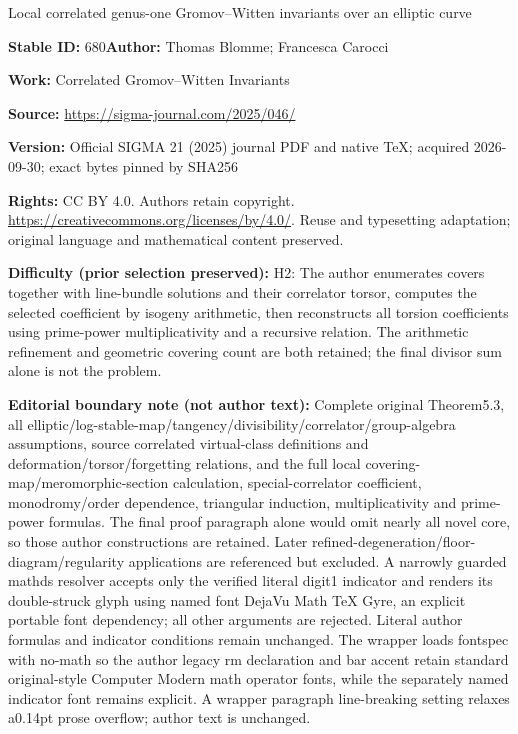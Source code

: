 \documentclass[11pt]{article}
\numberwithin{equation}{section}
\numberwithin{equation}{section}
\theoremstyle{definition}
\begin{document}
\begin{center}\Large Local correlated genus-one Gromov–Witten invariants over an elliptic curve\end{center}
\noindent\textbf{Stable ID:} 680\quad\textbf{Author:} Thomas Blomme; Francesca Carocci\par
\noindent\textbf{Work:} Correlated Gromov–Witten Invariants\par
\noindent\textbf{Source:} \url{https://sigma-journal.com/2025/046/}\par
\noindent\textbf{Version:} Official SIGMA 21 (2025) journal PDF and native TeX; acquired 2026-09-30; exact bytes pinned by SHA256\par
\noindent\textbf{Rights:} CC BY 4.0. Authors retain copyright. \url{https://creativecommons.org/licenses/by/4.0/}. Reuse and typesetting adaptation; original language and mathematical content preserved.\par
\noindent\textbf{Difficulty (prior selection preserved):} {\CJKfont H2: The author enumerates covers together with line-bundle solutions and their correlator torsor, computes the selected coefficient by isogeny arithmetic, then reconstructs all torsion coefficients using prime-power multiplicativity and a recursive relation. The arithmetic refinement and geometric covering count are both retained; the final divisor sum alone is not the problem.}\par
\medskip\noindent\textbf{Editorial boundary note (not author text):} Complete original Theorem5.3, all elliptic/log-stable-map/tangency/divisibility/correlator/group-algebra assumptions, source correlated virtual-class definitions and deformation/torsor/forgetting relations, and the full local covering-map/meromorphic-section calculation, special-correlator coefficient, monodromy/order dependence, triangular induction, multiplicativity and prime-power formulas. The final proof paragraph alone would omit nearly all novel core, so those author constructions are retained. Later refined-degeneration/floor-diagram/regularity applications are referenced but excluded. A narrowly guarded mathds resolver accepts only the verified literal digit1 indicator and renders its double-struck glyph using named font DejaVu Math TeX Gyre, an explicit portable font dependency; all other arguments are rejected. Literal author formulas and indicator conditions remain unchanged. The wrapper loads fontspec with no-math so the author legacy rm declaration and bar accent retain standard original-style Computer Modern math operator fonts, while the separately named indicator font remains explicit. A wrapper paragraph line-breaking setting relaxes a0.14pt prose overflow; author text is unchanged.\par
\end{document}
